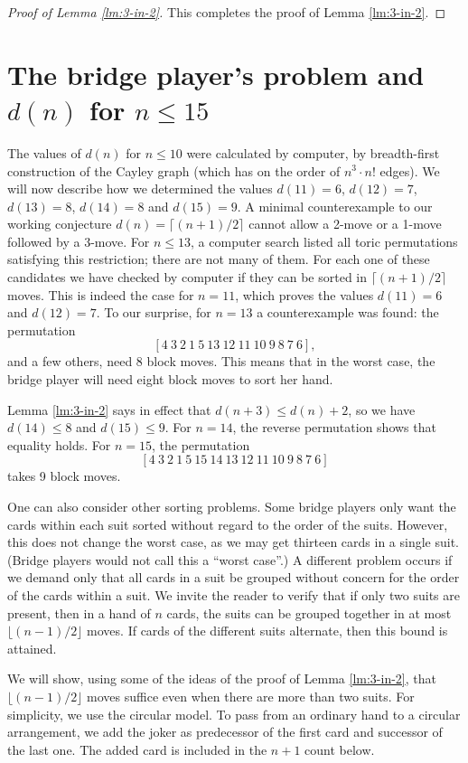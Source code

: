 \documentclass[11pt]{amsart} %
\begin{document}
\begin{proof}[Proof of Lemma \ref{lm:3-in-2}]
This completes the proof of Lemma \ref{lm:3-in-2}.
\end{proof}

\section{The bridge player's problem and $d(n)$ for $n\le 15$}
\label{sc:values} The values of $d(n)$ for $n\leq 10$ were
calculated by computer, by breadth-first construction of the Cayley graph
(which has on the order of $n^3\cdot n!$ edges).
 We will now describe how we determined the values $d(11)=6$, $d(12)=7$,
$d(13)=8$, $d(14)=8$ and $d(15)=9$. A minimal counterexample to
our working conjecture $d(n)=\lceil(n+1)/2\rceil$ cannot allow a
2-move or a 1-move followed by a 3-move.  For $n\le 13$, a
computer search listed all toric permutations satisfying this
restriction; there are not many of them. For each one of these
candidates we have checked by computer if they can be sorted in
$\lceil(n+1)/2\rceil$ moves. This is indeed the case for $n=11$,
which proves the values $d(11)=6$ and $d(12)=7$. To our surprise,
for $n=13$ a counterexample was found: the permutation $$[4\ 3\ 2\
1\ 5\ 13\ 12\ 11\ 10\ 9\ 8\ 7\ 6],$$ and a few others, need 8
block moves. This means that in the worst case, the bridge player
will need eight block moves to sort her hand.

Lemma \ref{lm:3-in-2} says in effect that $d(n+3)\le d(n)+2$, so
we have $d(14)\le 8$ and $d(15)\le 9$. For $n=14$, the reverse
permutation shows that equality holds. For $n=15$, the permutation
$$[4\ 3\ 2\ 1\ 5\ 15\ 14\ 13\ 12\ 11\ 10\ 9\ 8\ 7\ 6]$$ takes 9
block moves.

One can also consider other sorting problems. Some bridge players
only want the cards within each suit sorted without regard to the order
of the suits.
However, this does not change
the worst case, as we may get thirteen cards in a single suit.
(Bridge players would not call this a ``worst case''.) A
different problem occurs if we demand only that all cards in a
suit be grouped without concern for the order
of the cards within a suit. We invite the reader to verify that if
only two suits are present, then in a hand of $n$ cards, the suits
can be grouped together in at most $\lfloor (n-1)/2 \rfloor$
moves. If cards of the different suits alternate, then this bound
is attained.

We will show, using some of the ideas of the proof of Lemma
\ref{lm:3-in-2}, that $\lfloor (n-1)/2 \rfloor$ moves suffice even
when there are more than two suits. For simplicity, we use the
circular model. To pass from an ordinary hand to a circular
arrangement, we add the joker as
predecessor of the first card and successor of the last one.
The added card is included in the $n+1$ count below.
\end{document}
